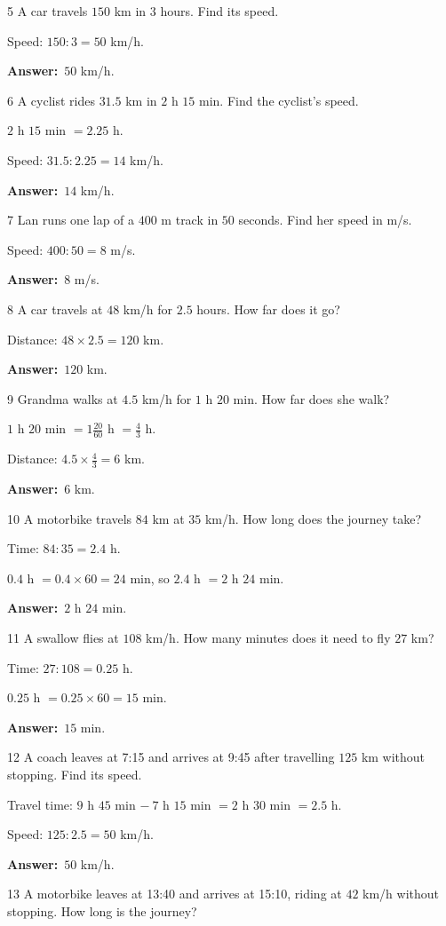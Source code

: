 \documentclass[11pt]{article}
\newif\ifsol \solfalse
\providecommand{\AnsWord}{Đáp số}
\newcommand{\dapso}[1]{\par\textbf{\AnsWord:}\ #1}
\newcommand{\probsol}[1]{%
  \begin{lrbox}{\solmeasure}\begin{minipage}{\dimexpr\linewidth-24pt\relax}#1\end{minipage}\end{lrbox}%
  \ifsol
    \begin{solbox}#1\end{solbox}%
  \else
    \setlength{\solht}{\dimexpr\ht\solmeasure+\dp\solmeasure+0.85cm\relax}%
    \ifdim\solht<1.35cm\setlength{\solht}{1.35cm}\fi
    \begin{tcolorbox}[colback=white,colframe=Line,boxrule=0.8pt,arc=5pt,
      left=8pt,right=8pt,top=4pt,bottom=4pt,height=\solht]{\footnotesize\color{Slate}\itshape\WorkWord}\end{tcolorbox}%
  \fi}
\newcommand{\gap}{\vspace{0.3cm}}
\def\WorkWord{Your work:}
\def\AnsWord{Answer}
\begin{document}
\gap
\begin{probbox}{5}{\relax}
A car travels $150$ km in $3$ hours. Find its speed.
\end{probbox}
\probsol{
Speed: $150:3=50$ km/h.
\dapso{$50$ km/h.}}
\gap
\begin{probbox}{6}{\relax}
A cyclist rides $31.5$ km in $2$ h $15$ min. Find the cyclist's speed.
\end{probbox}
\probsol{
$2$ h $15$ min $=2.25$ h.\par
Speed: $31.5:2.25=14$ km/h.
\dapso{$14$ km/h.}}
\gap
\begin{probbox}{7}{\relax}
Lan runs one lap of a $400$ m track in $50$ seconds. Find her speed in m/s.
\end{probbox}
\probsol{
Speed: $400:50=8$ m/s.
\dapso{$8$ m/s.}}
\gap
\begin{probbox}{8}{\relax}
A car travels at $48$ km/h for $2.5$ hours. How far does it go?
\end{probbox}
\probsol{
Distance: $48\times2.5=120$ km.
\dapso{$120$ km.}}
\gap
\begin{probbox}{9}{\relax}
Grandma walks at $4.5$ km/h for $1$ h $20$ min. How far does she walk?
\end{probbox}
\probsol{
$1$ h $20$ min $=1\frac{20}{60}$ h $=\frac43$ h.\par
Distance: $4.5\times\frac43=6$ km.
\dapso{$6$ km.}}
\gap
\begin{probbox}{10}{\relax}
A motorbike travels $84$ km at $35$ km/h. How long does the journey take?
\end{probbox}
\probsol{
Time: $84:35=2.4$ h.\par
$0.4$ h $=0.4\times60=24$ min, so $2.4$ h $=2$ h $24$ min.
\dapso{$2$ h $24$ min.}}
\gap
\begin{probbox}{11}{\relax}
A swallow flies at $108$ km/h. How many minutes does it need to fly $27$ km?
\end{probbox}
\probsol{
Time: $27:108=0.25$ h.\par
$0.25$ h $=0.25\times60=15$ min.
\dapso{$15$ min.}}
\gap
\begin{probbox}{12}{\relax}
A coach leaves at 7:15 and arrives at 9:45 after travelling $125$ km without stopping. Find its speed.
\end{probbox}
\probsol{
Travel time: $9$ h $45$ min $-\ 7$ h $15$ min $=2$ h $30$ min $=2.5$ h.\par
Speed: $125:2.5=50$ km/h.
\dapso{$50$ km/h.}}
\gap
\begin{probbox}{13}{\relax}
A motorbike leaves at 13:40 and arrives at 15:10, riding at $42$ km/h without stopping. How long is the journey?
\end{probbox}
\end{document}
